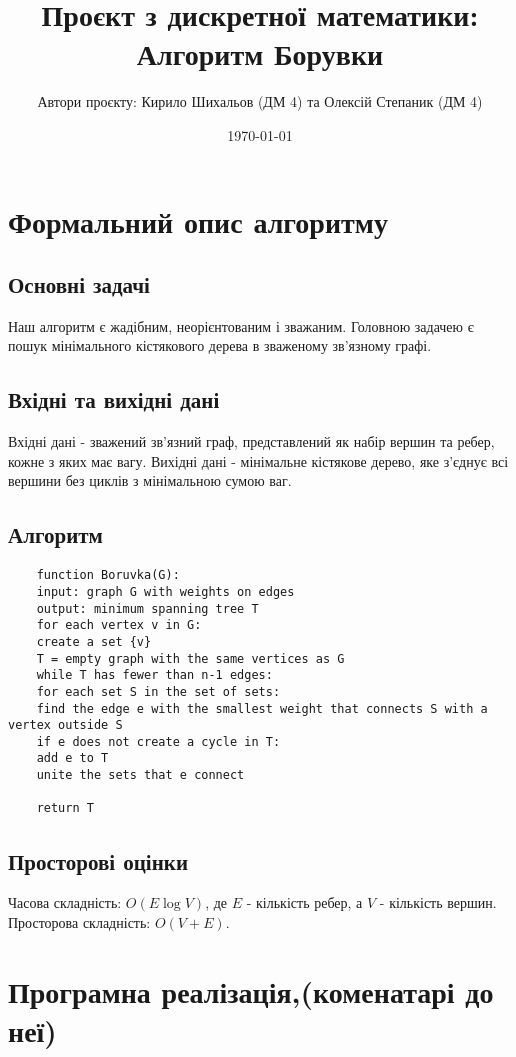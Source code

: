 \documentclass[12pt, letterpaper, twoside]{article}
\title{Проєкт з дискретної математики: 
	Алгоритм Борувки}
\author{Автори проєкту: Кирило Шихальов (ДМ 4) та Олексій Степаник (ДМ 4)}
\date{\today}
\begin{document}
	\maketitle
	\section*{Формальний опис алгоритму}
\subsection{Основні задачі}
Наш алгоритм є жадібним, неорієнтованим і зважаним. Головною задачею є пошук мінімального кістякового дерева в зваженому зв'язному графі.
\grapicspath{{}}

\subsection{Вхідні та вихідні дані}
Вхідні дані - зважений зв'язний граф, представлений як набір вершин та ребер, кожне з яких має вагу. Вихідні дані - мінімальне кістякове дерево, яке з'єднує всі вершини без циклів з мінімальною сумою ваг.

\subsection{Алгоритм}
\begin{verbatim}	
	function Boruvka(G):
	input: graph G with weights on edges
	output: minimum spanning tree T
	for each vertex v in G:
	create a set {v}
	T = empty graph with the same vertices as G
	while T has fewer than n-1 edges:
	for each set S in the set of sets:
	find the edge e with the smallest weight that connects S with a vertex outside S
	if e does not create a cycle in T:
	add e to T
	unite the sets that e connect
	
	return T
\end{verbatim}
\subsection{Просторові оцінки}
Часова складність: \(O(E\log V)\), де \(E\) - кількість ребер, а \(V\) - кількість вершин. Просторова складність: \(O(V+E)\).

\section{Програмна реалізація,(коменатарі до неї)}
\end{document}
